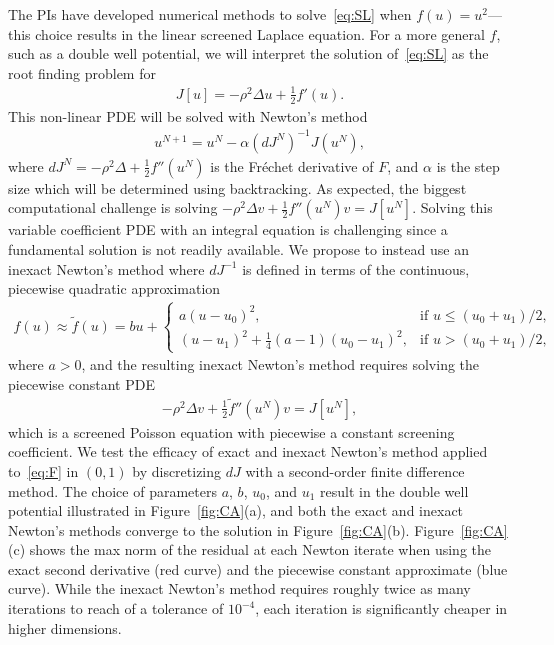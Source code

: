The PIs have developed numerical methods to solve~\eqref{eq:SL} when
$f(u) = u^2$---this choice results in the linear screened Laplace
equation. For a more general $f$, such as a double well potential, we
will interpret the solution of~\eqref{eq:SL} as the root finding problem
for
\begin{align}
  \label{eq:F}
  J[u] = -\rho^2 \Delta u + \tfrac{1}{2}f'(u).
\end{align}
This non-linear PDE will be solved with Newton's method
\begin{align*}
  u^{N+1} = u^{N} - \alpha (dJ^N)^{-1} J(u^N),
\end{align*}
where $dJ^N = -\rho^2 \Delta + \tfrac{1}{2}f''(u^N)$ is the Fr\'{e}chet derivative
of $F$, and $\alpha$ is the step size which will be determined using
backtracking. As expected, the biggest computational challenge is
solving $- \rho^2 \Delta v + \tfrac{1}{2}f''(u^{N}) v = J[u^N]$. Solving this
variable coefficient PDE with an integral equation is challenging since
a fundamental solution is not readily available. We propose to instead
use an inexact Newton's method where $dJ^{-1}$ is defined in terms of
the continuous, piecewise quadratic approximation
\begin{align*}
  f(u) \approx \tilde{f}(u) = bu + \begin{cases}
    a(u - u_0)^2, &\mbox{if } u \leq (u_0 + u_1)/2, \\
    (u - u_1)^2 + \tfrac{1}{4}(a-1)(u_0-u_1)^2 , &\mbox{if } u > (u_0 + u_1)/2,
  \end{cases}
\end{align*}
where $a>0$, and the resulting inexact Newton's method requires solving
the piecewise constant PDE
\begin{align}
  \label{eq:screenedPoisson}
  -\rho^2 \Delta v + \tfrac{1}{2}\tilde{f}''(u^{N})v = J[u^N],
\end{align}
which is a screened Poisson equation with piecewise a constant screening
coefficient. We test the efficacy of exact and inexact Newton's method
applied to~\eqref{eq:F} in $(0,1)$ by discretizing $dJ$ with a
second-order finite difference method. The choice of parameters $a$,
$b$, $u_0$, and $u_1$ result in the double well potential illustrated in
Figure~\ref{fig:CA}(a), and both the exact and inexact Newton's methods
converge to the solution in Figure~\ref{fig:CA}(b).
Figure~\ref{fig:CA}(c) shows the max norm of the residual at each Newton
iterate when using the exact second derivative (red curve) and the
piecewise constant approximate (blue curve). While the inexact Newton's
method requires roughly twice as many iterations to reach of a tolerance
of $10^{-4}$, each iteration is significantly cheaper in higher
dimensions.

